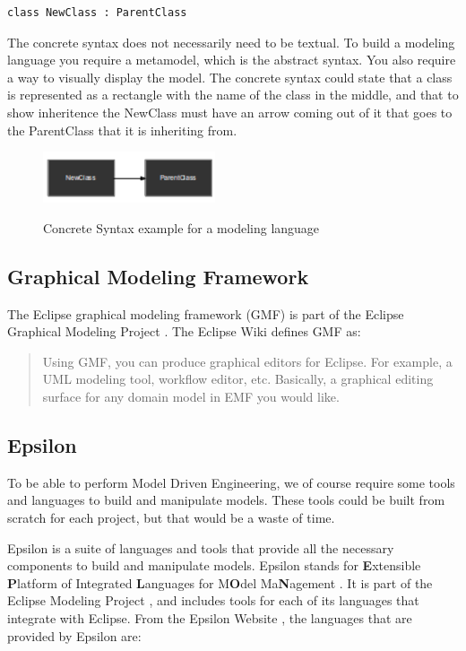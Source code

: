 \begin{lstlisting}
class NewClass : ParentClass
\end{lstlisting}

The concrete syntax does not necessarily need to be textual. To build a modeling language you require a metamodel, which is the abstract syntax. You also require a way to visually display the model. The concrete syntax could state that a class is represented as a rectangle with the name of the class in the middle, and that to show inheritence the NewClass must have an arrow coming out of it that goes to the ParentClass that it is inheriting from.

\begin{figure}[h]
\begin{center}
	\includegraphics[width=2in]{figures/concrete_syntax.png}
	\label{concreteSyntaxFigure}
	\caption{Concrete Syntax example for a modeling language}
\end{center}
\end{figure}

\subsection{Graphical Modeling Framework}

The Eclipse graphical modeling framework (GMF) is part of the Eclipse Graphical Modeling Project \citep{gmpSite}. The Eclipse Wiki \cite{gmpFAQ} defines GMF as:

\begin{quote} Using GMF, you can produce graphical editors for Eclipse. For example, a UML modeling tool, workflow editor, etc. Basically, a graphical editing surface for any domain model in EMF you would like. \end{quote}



\subsection{Epsilon}
To be able to perform Model Driven Engineering, we of course require some tools and languages to build and manipulate models. These tools could be built from scratch for each project, but that would be a waste of time.

Epsilon is a suite of languages and tools that provide all the necessary components to build and manipulate models. Epsilon stands for \textbf{E}xtensible \textbf{P}latform of Integrated \textbf{L}anguages for M\textbf{O}del Ma\textbf{N}agement \citep{epsilonWebsite}. It is part of the Eclipse Modeling Project \citep{ecliplseModelingProjectSite}, and includes tools for each of its languages that integrate with Eclipse. From the Epsilon Website \citep{epsilonWebsite}, the languages that are provided by Epsilon are:

